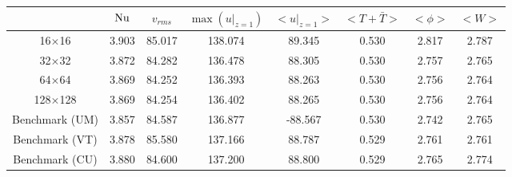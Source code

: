 \begin{tabular}{c|ccccccc}
    & $\mathrm{Nu}$ & $v_{rms}$ & $\max(u|_{z=1})$ & $<u|_{z=1}>$ & $<T + \bar{T}>$ & $<\phi>$ & $<W>$ \\
\hline
16$\times$16 & 3.903 & 85.017 & 138.074 & 89.345 & 0.530 & 2.817 & 2.787 \\
32$\times$32 & 3.872 & 84.282 & 136.478 & 88.305 & 0.530 & 2.757 & 2.765 \\
64$\times$64 & 3.869 & 84.252 & 136.393 & 88.263 & 0.530 & 2.756 & 2.764 \\
128$\times$128 & 3.869 & 84.254 & 136.402 & 88.265 & 0.530 & 2.756 & 2.764 \\
\hline
Benchmark (UM) & 3.857 & 84.587 & 136.877 & -88.567 & 0.530 & 2.742 & 2.765 \\
Benchmark (VT) & 3.878 & 85.580 & 137.166 & 88.787 & 0.529 & 2.761 & 2.761 \\
Benchmark (CU) & 3.880 & 84.600 & 137.200 & 88.800 & 0.529 & 2.765 & 2.774 \\
\end{tabular}
